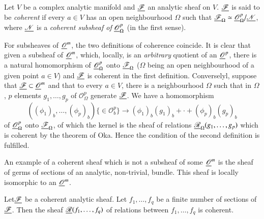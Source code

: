 \begin{defi*}
Let $V$ be a complex analytic manifold and $\underline{\mathscr{F}}$ an
analytic sheaf on $V$. $\underline{\mathscr{F}}$ is said to be
\textit{coherent} if every $a \in V$ has an open neighbourhood
$\Omega$ such that $\underline{\mathscr{F}}_\Omega \simeq
\underline{\mathscr{O}}^p_\Omega \big/ \underline{\mathscr{N}}$, where $\underline{\mathscr{N}}$ is
a \textit{coherent subsheaf of} $\underline{\mathscr{O}}^p_\Omega$ (in the
first sense).
\end{defi*}

For subsheaves of $\underline{\mathscr{O}}^m$, the two definitions of
coherence coincide. It is clear that given a subsheaf of
$\underline{\mathscr{O}}^m$, which, locally, is an \textit{arbitrary} quotient
of an $\underline{\mathscr{O}}^p$, there is a natural homomorphism of
$\underline{\mathscr{O}}^p_\Omega$ onto $\underline{\mathscr{F}}_\Omega$ ($\Omega$
being an open neighbourhood of a given point $a \in V$) and
$\underline{\mathscr{F}}$ is coherent in the first definition. Converselyl,
suppose that $\underline{\mathscr{F}} \subset \underline{\mathscr{O}}^m$ and that to
every $a \in V$, there is a neighbourhood $\Omega$ such that in
$\Omega$, $p$ elements $g_1, \ldots, g_p$ of $\mathscr{O}^p_\Omega$
generate $\underline{\mathscr{F}}$. We have a homomorphism
$$
((\phi_1)_b, \ldots, (\phi_p)_b) \{\in \mathscr{O}^p_b\} \to
(\phi_1)_b (g_1)_b + \cdot + (\phi_p)_b (g_p)_b
$$
of $\underline{\mathscr{O}}^p_\Omega$ onto $\underline{\mathscr{F}}_\Omega$, of which
the kernel is the sheaf of relations $\u{\mathscr{R}}_\Omega(g_1,
\ldots,\break g_p)$ which is coherent by the theorem of Oka. Hence the
condition of the second definition is fulfilled. 

An example of a coherent sheaf which is not a subsheaf of some
$\underline{\mathscr{O}}^m$  is the sheaf of germs of sections of an analytic,
non-trivial, bundle. This sheaf is locally isomorphic to an
$\underline{\mathscr{O}}^m$. 

\setcounter{proposition}{0}
\begin{proposition}\label{chap12:prop1}
Let\pageoriginale $\underline{\mathscr{F}}$ be a coherent analytic sheaf. Let
$f_1, \ldots, f_q$ be a finite number of sections of
$\underline{\mathscr{F}}$. Then the sheaf $\underline{\mathscr{R}} (f_1 , \ldots,
f_q)$ of relations between $f_1, \ldots, f_q$ is coherent. 
\end{proposition}

